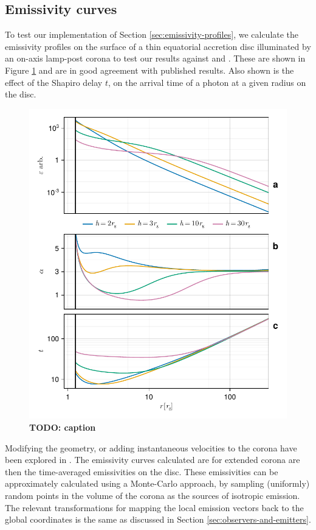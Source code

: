 \documentclass[fleqn,usenatbib]{mnras}
\newcommand{\todo}[1]{{\noindent \bf \color{red} TODO: #1}}
\begin{document}
\subsection{Emissivity curves}

To test our implementation of Section \ref{sec:emissivity-profiles}, we
calculate the emissivity profiles on the surface of a thin equatorial accretion
disc illuminated by an on-axis lamp-post corona to test our results against
\cite{wilkins_understanding_2012} and \cite{dauser_irradiation_2013}. These are
shown in Figure \ref{fig:emissivity-profiles} and are in good agreement with
published results. Also shown is the effect of the Shapiro delay $t$, on the
arrival time of a photon at a given radius on the disc.

\begin{figure}
	\centering
	\includegraphics[width=0.99\linewidth]{figures/emissivity.point-source.pdf}
	\caption{\todo{caption}}
	\label{fig:emissivity-profiles}
\end{figure}

Modifying the geometry, or adding instantaneous velocities to the corona have
been explored in \cite{gonzalez_probing_2017}. The emissivity curves calculated
are for extended corona are then the time-averaged emissivities on the disc.
These emissivities can be approximately calculated using a Monte-Carlo approach,
by sampling (uniformly) random points in the volume of the corona as the sources
of isotropic emission. The relevant transformations for mapping the local
emission vectors back to the global coordinates is the same as discussed in
Section \ref{sec:observers-and-emitters}.
\end{document}
